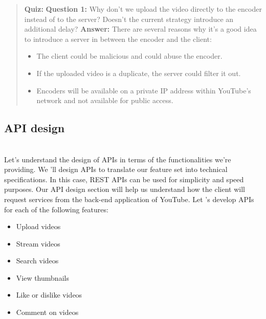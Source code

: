 \begin{quote}
\textbf{Quiz:}
\textbf{Question 1:} Why don't we upload the video directly to the encoder instead of to the server? Doesn't the current strategy introduce an additional delay?
\textbf{Answer:} There are several reasons why it's a good idea to introduce a server in between the encoder and the client: 
\begin{itemize}
    \item The client could be malicious and could abuse the encoder.
    \item If the uploaded video is a duplicate, the server could filter it out.
    \item Encoders will be available on a private IP address within YouTube's network and not available for public access.
\end{itemize}


\end{quote}

\subsection{API design}\label{ezec0rAvP5Ph7c_qfsbZ8}
\\
\hfill\break
Let's understand the design of APIs in terms of the functionalities we're providing. We 'll design APIs to translate our feature set into technical specifications. In this case, REST APIs can be used for simplicity and speed purposes. Our
API design section will help us understand how the client will request services from the back-end application of YouTube. Let 's develop APIs for each of the following features:

\begin{itemize}
\item
\protect{}\label{DS_WCgJzOcmAPlU0Zs3jn}
Upload videos
\item
\protect{}\label{byePfuqv-oSl7_BoahBbu}
Stream videos
\item
\protect{}\label{rBvzzjRNdLgbBZBU9cKu1}
Search videos
\item
\protect{}\label{sDf-21OKlmSlR6bjYHCyV}
View thumbnails
\item
\protect{}\label{MqFkGqkH9_WeK26AqI99E}
Like or dislike videos
\item
\protect{}\label{vyRrgPXClHoWHRq47DTUS}
Comment on videos\\
\end{itemize}

